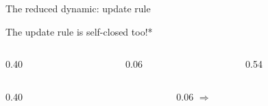 \documentclass[aspectratio=169,11pt]{beamer}
\begin{document}
\begin{frame}{The reduced dynamic: update rule}
  \begin{center}\large
    The update rule is self-closed too!{\color{slideorange}*}
  \end{center}
  \vspace{0.2em}
  \begin{columns}[c]
    \begin{column}{0.40\textwidth}
      \centering{}
    \end{column}
    \begin{column}{0.06\textwidth}\end{column}
    \begin{column}{0.54\textwidth}
      \centering{}
    \end{column}
  \end{columns}
  \vspace{0.2em}
  \begin{columns}[c]
    \begin{column}{0.40\textwidth}
    \end{column}
    \begin{column}{0.06\textwidth}
      \centering$\Longrightarrow$
    \end{column}

\end{columns}
\end{frame}
\end{document}
